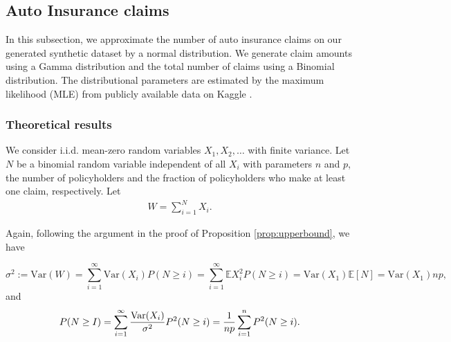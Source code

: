 \documentclass[pdflatex,sn-mathphys-ay]{sn-jnl}
\newcommand{\beas}{\begin{eqnarray*}}
\newcommand{\enas}{\end{eqnarray*}}
\newcommand{\E}{\mathbb{E}}
\newcommand{\Var}{\mathrm{Var}}
\theoremstyle{thmstyleone}%
\theoremstyle{thmstyletwo}%
\theoremstyle{thmstylethree}%
\begin{document}
\newpage
\subsection{Auto Insurance claims}

In this subsection, we approximate the number of auto insurance claims on our generated synthetic dataset by a normal distribution. We generate claim amounts using a Gamma distribution and the total number of claims using a Binomial distribution. The distributional parameters are estimated by the maximum likelihood (MLE) from publicly available data on Kaggle \citep{Xiaomeng}. 

\subsubsection{Theoretical results}
We consider i.i.d. mean-zero random variables $X_1,X_2,\ldots$ with finite variance. Let $N$ be a binomial random variable independent of all $X_i$ with parameters $n$ and $p$, the number of policyholders and the fraction of policyholders who make at least one claim, respectively. Let
\beas
W=\sum_{i=1}^NX_i.
\enas 

 
 Again, following the argument in the proof of Proposition \ref{prop:upperbound}, we have
 
 $$\sigma^2 := \Var(W) = \sum_{i=1}^\infty \Var(X_i) P(N\ge i)=\sum_{i=1}^\infty\E X^2_i P(N\ge i)=\Var(X_1)\E[N]=\Var(X_1) np,$$
and  \[
P(N\ge I) = \sum_{i=1}^\infty \frac{\Var(X_i)}{\sigma^2}P^2(N \ge i) ={1\over np}\sum_{i=1}^nP^2(N\ge i).
\]
\end{document}
